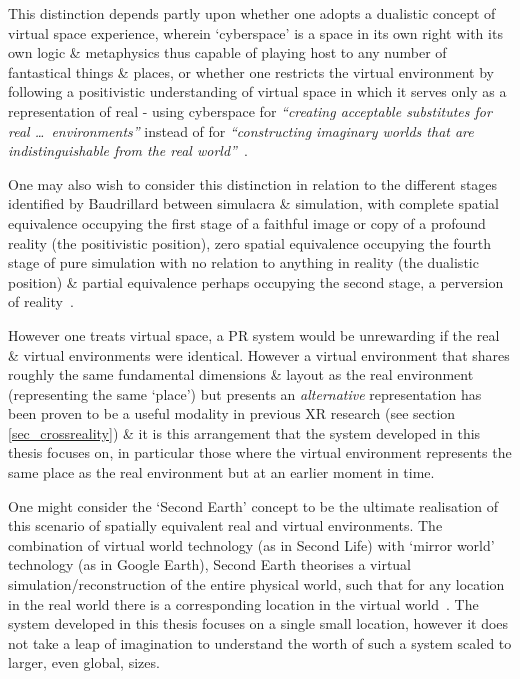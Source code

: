This distinction depends partly upon whether one adopts a dualistic concept of virtual space experience, wherein `cyberspace' is a space in its own right with its own logic \& metaphysics thus capable of playing host to any number of fantastical things \& places, or whether one restricts the virtual environment by following a positivistic understanding of virtual space in which it serves only as a representation of real - using cyberspace for \textit{``creating acceptable substitutes for real \ldots\ environments''} instead of for \textit{``constructing imaginary worlds that are indistinguishable from the real world''}~\cite{Qvortrup2002}.

One may also wish to consider this distinction in relation to the different stages identified by Baudrillard between simulacra \& simulation, with complete spatial equivalence occupying the first stage of a faithful image or copy of a profound reality (the positivistic position), zero spatial equivalence occupying the fourth stage of pure simulation with no relation to anything in reality (the dualistic position) \& partial equivalence perhaps occupying the second stage, a perversion of reality~\cite{Baudrillard1994}.


However one treats virtual space, a PR system would be unrewarding if the real \& virtual environments were identical\turklevrfootnote{}. However a virtual environment that shares roughly the same fundamental dimensions \& layout as the real environment (representing the same `place') but presents an \textit{alternative} representation has been proven to be a useful modality in previous XR research (see section \ref{sec_crossreality}) \& it is this arrangement that the system developed in this thesis focuses on, in particular those where the virtual environment represents the same place as the real environment but at an earlier moment in time.

One might consider the `Second Earth' concept to be the ultimate realisation of this scenario of spatially equivalent real and virtual environments. The combination of virtual world technology (as in Second Life) with `mirror world' technology (as in Google Earth), Second Earth theorises a virtual simulation/reconstruction of the entire physical world, such that for any location in the real world there is a corresponding location in the virtual world~\cite{Roush2007}. The system developed in this thesis focuses on a single small location, however it does not take a leap of imagination to understand the worth of such a system scaled to larger, even global, sizes.


